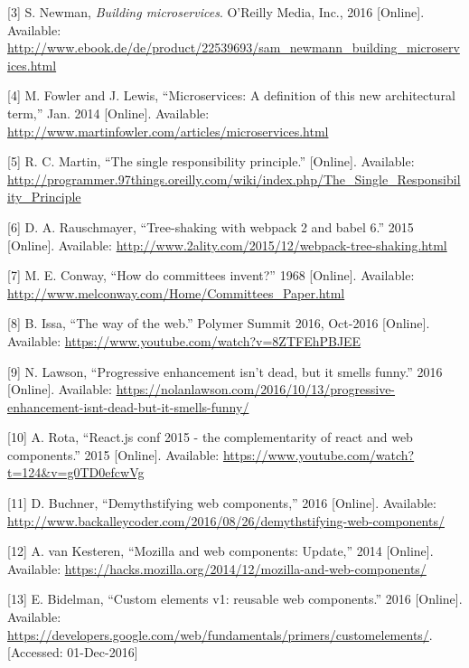 \documentclass[]{article}
\begin{document}
\hypertarget{ref-Newman2015}{}
{[}3{]} S. Newman, \emph{Building microservices}. O'Reilly Media, Inc.,
2016 {[}Online{]}. Available:
\url{http://www.ebook.de/de/product/22539693/sam_newmann_building_microservices.html}

\hypertarget{ref-Fowler2014}{}
{[}4{]} M. Fowler and J. Lewis, ``Microservices: A definition of this
new architectural term,'' Jan. 2014 {[}Online{]}. Available:
\url{http://www.martinfowler.com/articles/microservices.html}

\hypertarget{ref-Martin}{}
{[}5{]} R. C. Martin, ``The single responsibility principle.''
{[}Online{]}. Available:
\url{http://programmer.97things.oreilly.com/wiki/index.php/The_Single_Responsibility_Principle}

\hypertarget{ref-Rauschmayer2015}{}
{[}6{]} D. A. Rauschmayer, ``Tree-shaking with webpack 2 and babel 6.''
2015 {[}Online{]}. Available:
\url{http://www.2ality.com/2015/12/webpack-tree-shaking.html}

\hypertarget{ref-Conway1968}{}
{[}7{]} M. E. Conway, ``How do committees invent?'' 1968 {[}Online{]}.
Available: \url{http://www.melconway.com/Home/Committees_Paper.html}

\hypertarget{ref-Issa2016}{}
{[}8{]} B. Issa, ``The way of the web.'' Polymer Summit 2016, Oct-2016
{[}Online{]}. Available:
\url{https://www.youtube.com/watch?v=8ZTFEhPBJEE}

\hypertarget{ref-Lawson2016}{}
{[}9{]} N. Lawson, ``Progressive enhancement isn't dead, but it smells
funny.'' 2016 {[}Online{]}. Available:
\url{https://nolanlawson.com/2016/10/13/progressive-enhancement-isnt-dead-but-it-smells-funny/}

\hypertarget{ref-Rota2015}{}
{[}10{]} A. Rota, ``React.js conf 2015 - the complementarity of react
and web components.'' 2015 {[}Online{]}. Available:
\url{https://www.youtube.com/watch?t=124\&v=g0TD0efcwVg}

\hypertarget{ref-Buchner2016}{}
{[}11{]} D. Buchner, ``Demythstifying web components,'' 2016
{[}Online{]}. Available:
\url{http://www.backalleycoder.com/2016/08/26/demythstifying-web-components/}

\hypertarget{ref-vanKesteren2014}{}
{[}12{]} A. van Kesteren, ``Mozilla and web components: Update,'' 2014
{[}Online{]}. Available:
\url{https://hacks.mozilla.org/2014/12/mozilla-and-web-components/}

\hypertarget{ref-Bidelman2016}{}
{[}13{]} E. Bidelman, ``Custom elements v1: reusable web components.''
2016 {[}Online{]}. Available:
\url{https://developers.google.com/web/fundamentals/primers/customelements/}.
{[}Accessed: 01-Dec-2016{]}
\end{document}
